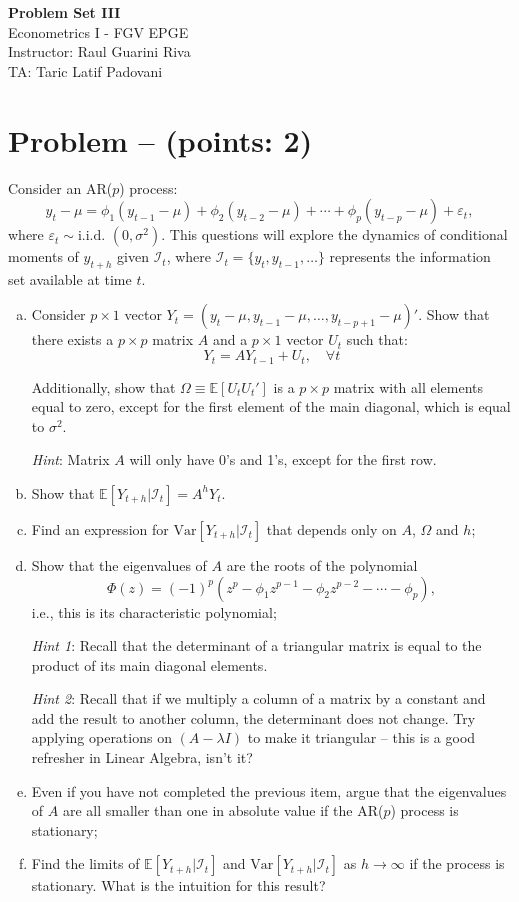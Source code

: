 \documentclass[11pt]{article}
\theoremstyle{definition}
\newcommand{\Var}{\mathrm{Var}}
\newcounter{problem}
\renewcommand{\theproblem}{\arabic{problem}}
\newcommand{\problem}[1]{
	\stepcounter{problem}
	\section*{Problem \theproblem{} -- (points: #1)}
}
\begin{document}
	\begin{center}
		{\LARGE{\textbf{Problem Set III}}}\\
		\vspace{0.2cm}
		Econometrics I - \textcolor{FGVBlue}{FGV EPGE}\\
		Instructor: Raul Guarini Riva \\
		TA: Taric Latif Padovani
	\end{center}

\problem{2}
Consider an AR($p$) process:
\begin{equation}
	y_t - \mu = \phi_1 (y_{t-1} - \mu) + \phi_2 (y_{t-2} - \mu) + \cdots + \phi_p (y_{t-p} - \mu) + \varepsilon_t,
	\label{eq:ar_p}
\end{equation}
where $\varepsilon_t \sim \text{i.i.d. } (0, \sigma^2)$. This questions will explore the dynamics of conditional moments of $y_{t+h}$ given $\mathcal{I}_t$, where $\mathcal{I}_t = \{y_t, y_{t-1}, \ldots\}$ represents the information set available at time $t$.

\begin{enumerate}[a)]
	\item Consider $p\times 1$ vector $Y_t = (y_t - \mu, y_{t-1} - \mu, \ldots, y_{t-p+1} - \mu)'$. Show that there exists a $p \times p$ matrix $A$ and a $p \times 1$ vector $U_t$ such that:
	\[Y_t = A Y_{t-1} + U_t, \quad \forall t\]

	Additionally, show that $\Omega \equiv \mathbb{E}[U_tU_t']$ is a $p \times p$ matrix with all elements equal to zero, except for the first element of the main diagonal, which is equal to $\sigma^2$.

	\textit{Hint}: Matrix $A$ will only have 0's and 1's, except for the first row.

	\item Show that $\mathbb{E}[Y_{t+h}|\mathcal{I}_t] = A^h Y_t$.
	\item Find an expression for $\Var[Y_{t+h}|\mathcal{I}_t]$ that depends only on $A$, $\Omega$ and $h$;
	\item Show that the eigenvalues of $A$ are the roots of the polynomial \[\Phi(z) = (-1)^{p}\left(z^p - \phi_1 z^{p-1} - \phi_2 z^{p-2} - \cdots - \phi_p\right),\] i.e., this is its characteristic polynomial;
	
	\textit{Hint 1}: Recall that the determinant of a triangular matrix is equal to the product of its main diagonal elements.
	
	\textit{Hint 2}: Recall that if we multiply a column of a matrix by a constant and add the result to another column, the determinant does not change. Try applying operations on $(A - \lambda I)$ to make it triangular -- this is a good refresher in Linear Algebra, isn't it? 

	\item Even if you have not completed the previous item, argue that the eigenvalues of $A$ are all smaller than one in absolute value if the AR($p$) process is stationary;
	\item Find the limits of $\mathbb{E}[Y_{t+h}|\mathcal{I}_t]$ and $\Var[Y_{t+h}|\mathcal{I}_t]$ as $h \to \infty$ if the process is stationary. What is the intuition for this result?
\end{enumerate}
\end{document}
